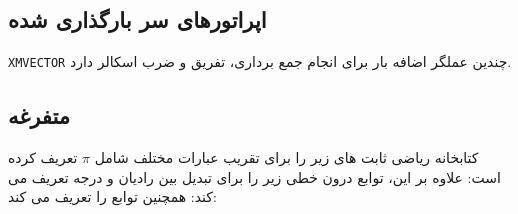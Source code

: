 \textbf{\vspace{-60pt}}
\subsection{\textbf{اپراتورهای سر بارگذاری شده}}
{
    \Large
    \begin{spacing}{1.5}
        \texttt{XMVECTOR} چندین عملگر اضافه بار برای انجام جمع برداری، تفریق و ضرب اسکالر دارد.
        \textbf{\vspace{6pt}}
        \lr{}
    \end{spacing}
}

\textbf{\vspace{-65pt}}
\subsection{\textbf{متفرغه}}
{
    \Large
    \begin{spacing}{1.5}
        کتابخانه ریاضی  ثابت های زیر را برای تقریب عبارات مختلف شامل $\pi$ تعریف کرده است:
        \textbf{\vspace{6pt}}
        \lr{}
        \textbf{\vspace{6pt}}
        علاوه بر این، توابع درون خطی زیر را برای تبدیل بین رادیان و درجه تعریف می کند:
        \textbf{\vspace{6pt}}
        \lr{}
        \textbf{\vspace{6pt}}
        همچنین توابع  را تعریف می کند:
        \textbf{\vspace{6pt}}
        \lr{}
    \end{spacing}
}

\textbf{\vspace{-60pt}}
